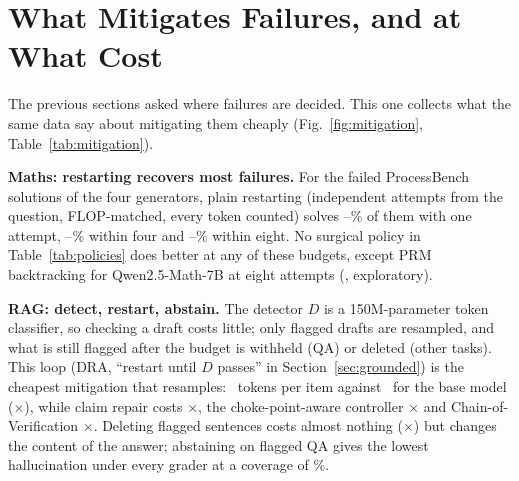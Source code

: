 \section{What Mitigates Failures, and at What Cost}\label{sec:mitigation}
The previous sections asked where failures are decided. This one collects what the same data say
about mitigating them cheaply (Fig.~\ref{fig:mitigation}, Table~\ref{tab:mitigation}).

\textbf{Maths: restarting recovers most failures.} For the failed ProcessBench solutions of the four
generators, plain restarting (independent attempts from the question, FLOP-matched, every token
counted) solves \recMinOne--\recMaxOne\% of them with one attempt, \recMinFour--\recMaxFour\% within
four and \recMinEight--\recMaxEight\% within eight. No surgical policy in Table~\ref{tab:policies}
does better at any of these budgets, except PRM backtracking for Qwen2.5-Math-7B at eight attempts
(\QwenMathPolPrmDropEightDiff, exploratory).

\textbf{RAG: detect, restart, abstain.} The detector $D$ is a 150M-parameter token classifier, so
checking a draft costs little; only flagged drafts are resampled, and what is still flagged after
the budget is withheld (QA) or deleted (other tasks). This loop (DRA, ``restart until $D$ passes'' in
Section~\ref{sec:grounded}) is the cheapest mitigation that resamples: \tokDra\ tokens per item against
\tokBase\ for the base model (\costDra$\times$), while claim repair costs \costRep$\times$, the
choke-point-aware controller \costCare$\times$ and Chain-of-Verification \costCove$\times$. Deleting
flagged sentences costs almost nothing (\costDel$\times$) but changes the content of the answer;
abstaining on flagged QA gives the lowest hallucination under every grader at a coverage of
\covAbst\%.

